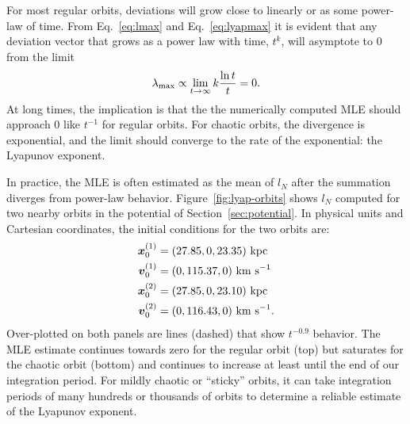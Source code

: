 \documentclass[letterpaper,12pt,preprint]{aastex}
\newcommand{\bs}[1]{\boldsymbol{#1}}
\begin{document}
For most regular orbits, deviations will grow close to linearly or as some power-law of time. 
From Eq.~\ref{eq:lmax} and Eq.~\ref{eq:lyapmax} it is evident that any deviation vector that grows as a power law with time, $t^k$, will asymptote to 0 from the limit 
\begin{equation}
	\lambda_{\rm max} \propto \lim_{t\rightarrow \infty} k \frac{\ln t}{t} = 0.
\end{equation}
At long times, the implication is that the the numerically computed MLE should approach 0 like $t^{-1}$ for regular orbits. For chaotic orbits, the divergence is exponential, and the limit should converge to the rate of the exponential: the Lyapunov exponent.

In practice, the MLE is often estimated as the mean of $l_N$ after the summation diverges from power-law behavior. Figure~\ref{fig:lyap-orbits} shows $l_N$ computed for two nearby orbits in the potential of Section~\ref{sec:potential}. In physical units and Cartesian coordinates, the initial conditions for the two orbits are:
\begin{align}
	\bs{x}_{0}^{(1)} &= (27.85, 0, 23.35)~{\rm kpc}\\
	\bs{v}_{0}^{(1)} &= (0, 115.37, 0)~{\rm km~s}^{-1}\\
	\bs{x}_{0}^{(2)} &= (27.85, 0, 23.10)~{\rm kpc}\\
	\bs{v}_{0}^{(2)} &= (0, 116.43, 0)~{\rm km~s}^{-1}.
\end{align}
Over-plotted on both panels are lines (dashed) that show $t^{-0.9}$ behavior. The MLE estimate continues towards zero for the regular orbit (top) but saturates for the chaotic orbit (bottom) and continues to increase at least until the end of our integration period. For mildly chaotic or ``sticky'' orbits, it can take integration periods of many hundreds or thousands of orbits to determine a reliable estimate of the Lyapunov exponent.
\end{document}
